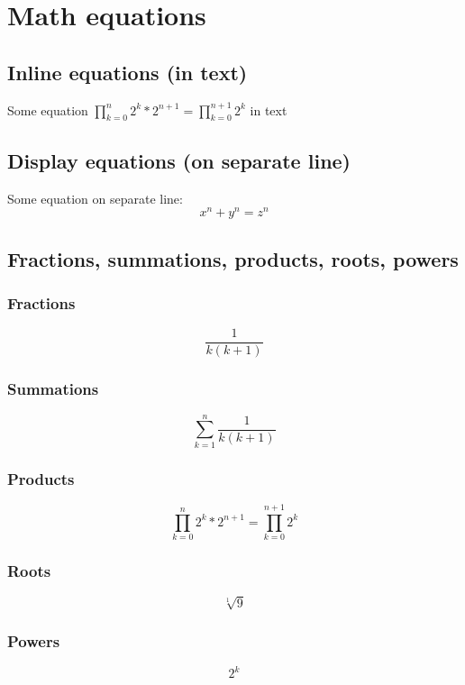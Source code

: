 \section{Math equations}

\subsection{Inline equations (in text)}
Some equation $\prod_{k=0}^{n}2^k*2^{n+1} =\prod_{k=0}^{n+1} 2^k$ in text
\subsection{Display equations (on separate line)}
Some equation on separate line:
\[ x^n + y^n = z^n \]

\subsection{Fractions, summations, products, roots, powers}

\subsubsection{Fractions}
\begin{equation}
    \frac{1}{k(k+1)}
\end{equation}

\subsubsection{Summations}
\begin{equation}
    \sum_{k=1}^{n}\frac{1}{k(k+1)}
\end{equation}

\subsubsection{Products}
\begin{equation}
    \prod_{k=0}^{n}2^k*2^{n+1}=\prod_{k=0}^{n+1} 2^k
\end{equation}

\subsubsection{Roots}
\begin{equation}
    \sqrt[1]{9}
\end{equation}

\subsubsection{Powers}
\begin{equation}
    2^k
\end{equation}